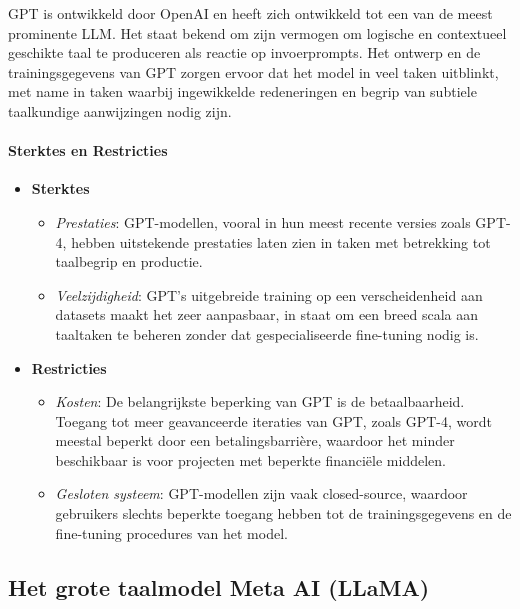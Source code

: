 GPT is ontwikkeld door OpenAI en heeft zich ontwikkeld tot een van de meest prominente LLM. Het staat bekend om zijn vermogen om logische en contextueel geschikte taal te produceren als reactie op invoerprompts. Het ontwerp en de trainingsgegevens van GPT zorgen ervoor dat het model in veel taken uitblinkt, met name in taken waarbij ingewikkelde redeneringen en begrip van subtiele taalkundige aanwijzingen nodig zijn.



\paragraph{Sterktes en Restricties}

\begin{itemize}
    \item \textbf{Sterktes}
    \begin{itemize}
        \item \textit{Prestaties}: GPT-modellen, vooral in hun meest recente versies zoals GPT-4, hebben uitstekende prestaties laten zien in taken met betrekking tot taalbegrip en productie.
        \item  \textit{Veelzijdigheid}: GPT's uitgebreide training op een verscheidenheid aan datasets maakt het zeer aanpasbaar, in staat om een breed scala aan taaltaken te beheren zonder dat gespecialiseerde fine-tuning nodig is.
    \end{itemize}
    \item \textbf{Restricties}
    \begin{itemize}
        \item \textit{Kosten}: De belangrijkste beperking van GPT is de betaalbaarheid. Toegang tot meer geavanceerde iteraties van GPT, zoals GPT-4, wordt meestal beperkt door een betalingsbarrière, waardoor het minder beschikbaar is voor projecten met beperkte financiële middelen.
        \item \textit{Gesloten systeem}:  GPT-modellen zijn vaak closed-source, waardoor gebruikers slechts beperkte toegang hebben tot de trainingsgegevens en de fine-tuning procedures van het model.
    \end{itemize}
\end{itemize}
 



\subsection{Het grote taalmodel Meta AI (LLaMA)}

